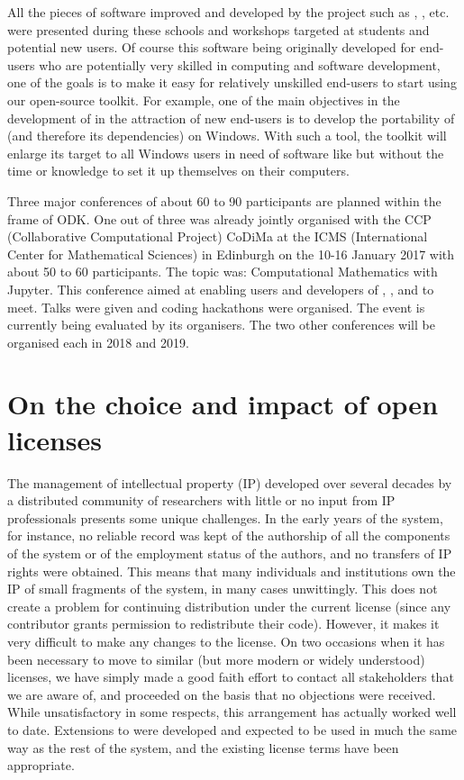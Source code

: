 \documentclass{deliverablereport}
\begin{document}
All the pieces of software improved and developed by the project such as \Sage, \Singular, etc. were presented during these schools and workshops targeted at students and potential new users. Of course this software being originally developed for end-users who are potentially very skilled in computing and software development, one of the goals is to make it easy  for relatively unskilled end-users to start using our open-source toolkit.
For example, one of the main objectives in the development of \Sage in the attraction of new end-users is to develop the portability of \Sage (and therefore its dependencies) on Windows. With such a tool, the toolkit will enlarge its target to all Windows users in need of software like \Sage but without the time or knowledge to set it up themselves on their computers.

Three major conferences of about 60 to 90 participants are planned within the frame of ODK. One out of three was already jointly organised with the CCP (Collaborative Computational Project) CoDiMa at the ICMS (International Center for Mathematical Sciences) in Edinburgh on the 10-16 January 2017 with about 50 to 60 participants. The topic was: Computational Mathematics with Jupyter. This conference aimed at enabling users and developers of \GAP, \Singular, \Sage and \Jupyter to meet. Talks were given and coding hackathons were organised. The event is currently being evaluated by its organisers.
The two other conferences will be organised each in 2018 and 2019.


\section{On the choice and impact of open licenses}

The management of intellectual property (IP) developed over several
decades by a distributed community of researchers with
little or no input from IP professionals
presents some unique challenges. In the early years of the \GAP
system, for instance, no reliable record was kept of the authorship of
all the components of the system or of the employment status of the
authors, and no transfers of IP rights were obtained. This means that
many individuals and institutions own the IP of small
fragments of the system, in many cases unwittingly.
This does not create a problem for continuing
distribution under the current license (since any contributor
grants permission to redistribute their code).
However, it makes it very difficult to make any changes to the
license. On two occasions when it has been necessary to move to
similar (but more modern or widely understood) licenses, we have simply
made a good faith effort to contact all stakeholders that we are aware
of, and proceeded on the basis that no objections were received.
While unsatisfactory in some respects, this arrangement has actually
worked well to date.
Extensions to \GAP were developed and expected to be used
in much the same way as the rest of the system, and the existing
license terms have been appropriate.
\end{document}
